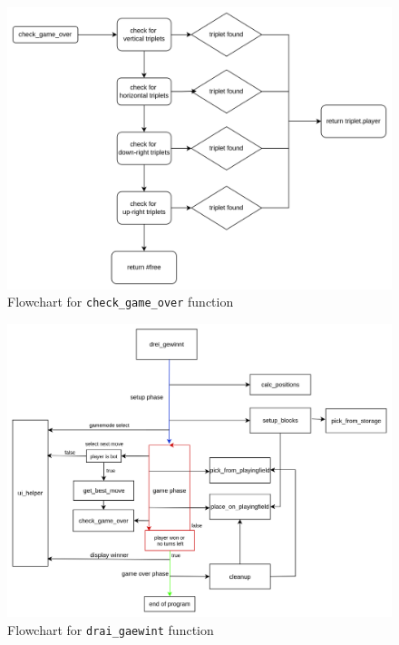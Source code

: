 \documentclass{article}
\begin{document}
        \begin{figure}[htbp]
            \centering
            \includegraphics[width=\textwidth]{../media/check_game_over.png}
            \caption{Flowchart for \texttt{check\_game\_over} function}\label{fig:check_game_over}
        \end{figure}

        \begin{figure}[htbp]
            \centering
            \includegraphics[width=\textwidth]{../media/drai_gaewint.png}
            \caption{Flowchart for \texttt{drai\_gaewint} function}\label{fig:drai_gaewint}
        \end{figure}
\end{document}
